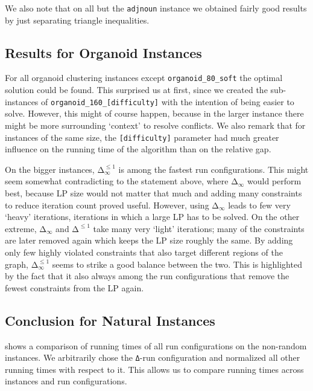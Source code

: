 We also note that on all but the \texttt{adjnoun} instance we obtained fairly good results by just separating triangle inequalities.

\subsection{Results for Organoid Instances}
For all organoid clustering instances except \texttt{organoid\_80\_soft} the optimal solution could be found.
This surprised us at first, since we created the sub-instances of \texttt{organoid\_160\_[difficulty]} with the intention of being easier to solve.
However, this might of course happen, because in the larger instance there might be more surrounding ‘context’ to resolve conflicts.
We also remark that for instances of the same size, the \texttt{[difficulty]} parameter had much greater influence on the running time of the algorithm than on the relative gap.

On the bigger instances, $\texttt{Δ}_{\infty}^{\leq 1}$ is among the fastest run configurations.
This might seem somewhat contradicting to the statement above, where $\texttt{Δ}_{\infty}$ would perform best,
because LP size would not matter that much and adding many constraints to reduce iteration count proved useful.
However, using $\texttt{Δ}_{\infty}$ leads to few very ‘heavy’ iterations, \ie iterations in which a large LP has to be solved.
On the other extreme, $\texttt{Δ}_{\infty}$ and $\texttt{Δ}^{\leq 1}$ take many very ‘light’ iterations; many of the constraints are later removed again which keeps the LP size roughly the same.
By adding only few highly violated constraints that also target different regions of the graph, $\texttt{Δ}_{\infty}^{\leq 1}$ seems to strike a good balance between the two.
This is highlighted by the fact that it also always among the run configurations that remove the fewest constraints from the LP again.

\subsection{Conclusion for Natural Instances}
 shows a comparison of running times of all run configurations on the non-random instances.
We arbitrarily chose the \texttt{Δ}-run configuration and normalized all other running times with respect to it.
This allows us to compare running times across instances and run configurations.

